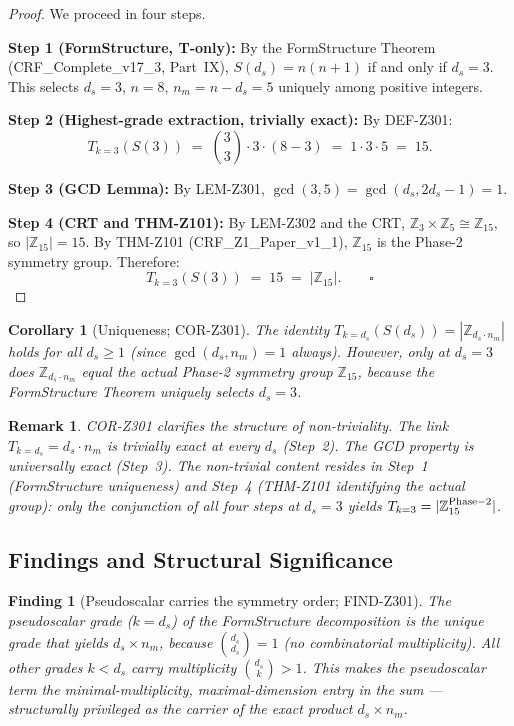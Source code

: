 \documentclass[12pt, a4paper]{article}
\newtheorem{corollary}{Corollary}[section]
\newtheorem{remark}{Remark}[section]
\newtheorem{finding}{Finding}[section]
\begin{document}
\begin{proof}
We proceed in four steps.

\textbf{Step 1 (FormStructure, T-only):}
By the FormStructure Theorem (CRF\_Complete\_v17\_3, Part~IX),
$S(d_s) = n(n+1)$ if and only if $d_s = 3$. This selects $d_s = 3$,
$n = 8$, $n_m = n - d_s = 5$ uniquely among positive integers.

\textbf{Step 2 (Highest-grade extraction, trivially exact):}
By DEF-Z301:
\[
  T_{k=3}(S(3))
  \;=\; \binom{3}{3} \cdot 3 \cdot (8 - 3)
  \;=\; 1 \cdot 3 \cdot 5
  \;=\; 15.
\]

\textbf{Step 3 (GCD Lemma):}
By LEM-Z301, $\gcd(3, 5) = \gcd(d_s, 2d_s-1) = 1$.

\textbf{Step 4 (CRT and THM-Z101):}
By LEM-Z302 and the CRT, $\mathbb{Z}_3 \times \mathbb{Z}_5 \cong
\mathbb{Z}_{15}$, so $|\mathbb{Z}_{15}| = 15$. By THM-Z101
(CRF\_Z1\_Paper\_v1\_1), $\mathbb{Z}_{15}$ is the Phase-2 symmetry
group. Therefore:
\[
  T_{k=3}(S(3)) \;=\; 15 \;=\; |\mathbb{Z}_{15}|. \qquad\square
\]
\end{proof}

\begin{corollary}[Uniqueness; COR-Z301]
\label{cor:unique}
The identity $T_{k=d_s}(S(d_s)) = |\mathbb{Z}_{d_s \cdot n_m}|$
holds for all $d_s \geq 1$ (since $\gcd(d_s, n_m) = 1$ always).
However, only at $d_s = 3$ does $\mathbb{Z}_{d_s \cdot n_m}$
equal the \emph{actual Phase-2 symmetry group}
$\mathbb{Z}_{15}$, because the FormStructure Theorem uniquely
selects $d_s = 3$.
\end{corollary}

\begin{remark}
COR-Z301 clarifies the structure of non-triviality. The link
$T_{k=d_s} = d_s \cdot n_m$ is trivially exact at every $d_s$
(Step~2). The GCD property is universally exact (Step~3). The
non-trivial content resides in Step~1 (FormStructure uniqueness)
and Step~4 (THM-Z101 identifying the actual group): only the
conjunction of all four steps at $d_s = 3$ yields
$T_{k=3} = |\mathbb{Z}_{15}^{\rm Phase-2}|$.
\end{remark}

\subsection{Findings and Structural Significance}
\label{sec:findings}

\begin{finding}[Pseudoscalar carries the symmetry order; FIND-Z301]
The pseudoscalar grade ($k = d_s$) of the FormStructure decomposition
is the unique grade that yields $d_s \times n_m$, because
$\binom{d_s}{d_s} = 1$ (no combinatorial multiplicity). All other
grades $k < d_s$ carry multiplicity $\binom{d_s}{k} > 1$.
This makes the pseudoscalar term the \emph{minimal-multiplicity,
maximal-dimension} entry in the sum --- structurally privileged
as the carrier of the exact product $d_s \times n_m$.
\end{finding}
\end{document}
